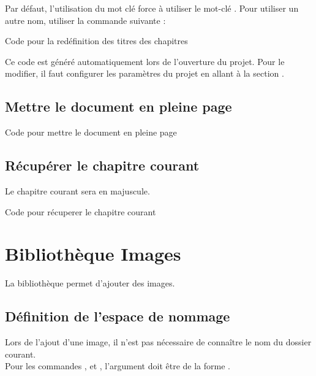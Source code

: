 {Par défaut, l'utilisation du mot clé  force à utiliser le mot-clé . Pour utiliser un autre nom, utiliser la commande suivante : 

\begin{Latex}{Code pour la redéfinition des titres des chapitres}
\end{Latex}
Ce code est généré automatiquement lors de l'ouverture du projet. Pour le modifier, il faut configurer les paramètres du projet en allant à la section .



\section{Mettre le document en pleine page}
\begin{Latex}{Code pour mettre le document en pleine page}
\setFullPage
\end{Latex}

\section{Récupérer le chapitre courant}

Le chapitre courant sera en majuscule.
\begin{Latex}{Code pour récuperer le chapitre courant}
\currentChapter
\end{Latex}


\chapter{Bibliothèque Images}

La bibliothèque  permet d'ajouter des images.

\section{Définition de l'espace de nommage}
\label{handleImages}

Lors de l'ajout d'une image, il n'est pas nécessaire de connaître le nom du dossier courant.\\

Pour les commandes ,  et , l'argument  doit être de la forme .

}

